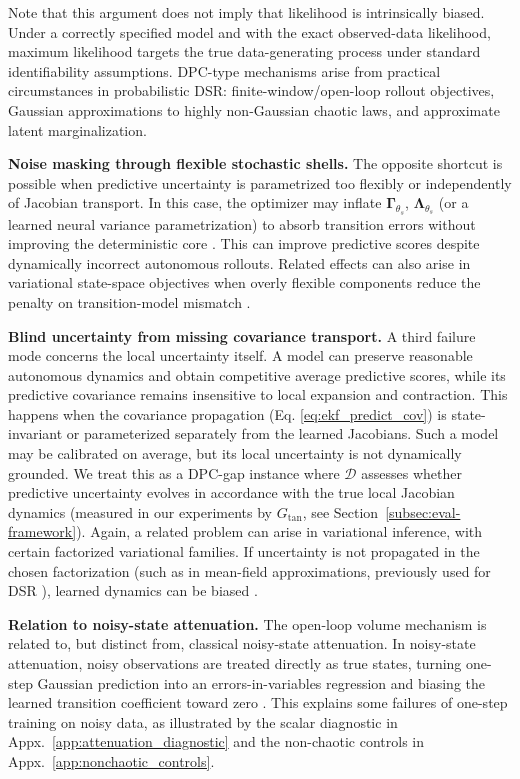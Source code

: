 \documentclass{article}
\theoremstyle{plain}
\theoremstyle{definition}
\theoremstyle{remark}
\begin{document}
Note that this argument does not imply that likelihood is intrinsically biased. Under a correctly specified model and with the exact observed-data likelihood, maximum likelihood targets the true data-generating process under standard
identifiability assumptions. DPC-type mechanisms arise from practical circumstances in probabilistic DSR: finite-window/open-loop rollout objectives, Gaussian approximations to highly non-Gaussian chaotic laws, and approximate latent marginalization.

\textbf{Noise masking through flexible stochastic shells.}
The opposite shortcut is possible when predictive uncertainty is parametrized
too flexibly or independently of Jacobian transport. In this case, the optimizer may inflate $\bm\Gamma_{\theta_s}$, $\bm\Lambda_{\theta_s}$ (or a learned neural variance parametrization) to absorb transition errors without improving the deterministic core \citep{levine2022framework}. This can improve predictive scores despite dynamically incorrect autonomous rollouts. Related effects can also arise in variational state-space objectives when overly flexible components reduce the penalty on transition-model mismatch \cite{zhao2023revisiting}.

\textbf{Blind uncertainty from missing covariance transport.}
A third failure mode concerns the local uncertainty itself. A model can preserve reasonable autonomous dynamics and obtain competitive average predictive scores,
while its predictive covariance remains insensitive to local expansion and
contraction. This happens when the covariance propagation (Eq. \ref{eq:ekf_predict_cov}) is state-invariant or
parameterized separately from the learned Jacobians. Such a model may be
calibrated on average, but its local uncertainty is not dynamically grounded. We treat this as a DPC-gap instance where $\mathcal D$ assesses whether predictive uncertainty evolves in accordance with the true local Jacobian dynamics (measured in our experiments by $G_{\mathrm{tan}}$, see Section~\ref{subsec:eval-framework}). Again, a related problem can arise in variational inference, with certain factorized variational families. If uncertainty is not propagated in the chosen factorization (such as in mean-field approximations, previously used for DSR \citep{brenner2022tractable}), learned dynamics can be biased \citep{turner2011two,bayer2021mind}.

\textbf{Relation to noisy-state attenuation.} The open-loop volume mechanism is related to, but distinct from, classical noisy-state attenuation. In noisy-state attenuation, noisy observations are treated directly as true states, turning one-step Gaussian prediction into an errors-in-variables regression and biasing the learned transition coefficient toward zero \citep{fuller1987measurement,staudenmayer2005measurement}. This explains some failures of one-step training on noisy data, as illustrated by the scalar diagnostic in Appx.~\ref{app:attenuation_diagnostic}
and the non-chaotic controls in Appx.~\ref{app:nonchaotic_controls}. 
\end{document}
